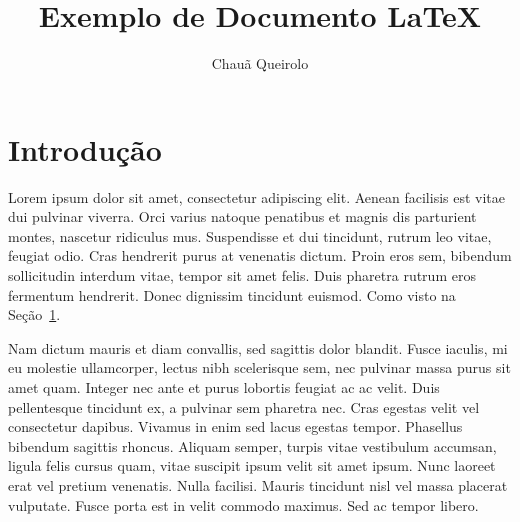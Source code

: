 \documentclass[11pt,twocolumn]{article}
\title{Exemplo de Documento \LaTeX}
\author{Chauã Queirolo}
\begin{document}
\maketitle

\tableofcontents



\section{Introdução}
\label{sec_introducao}

Lorem ipsum dolor sit amet, consectetur adipiscing elit. Aenean facilisis est vitae dui pulvinar viverra. Orci varius natoque penatibus et magnis dis parturient montes, nascetur ridiculus mus. Suspendisse et dui tincidunt, rutrum leo vitae, feugiat odio. Cras hendrerit purus at venenatis dictum. Proin eros sem, bibendum sollicitudin interdum vitae, tempor sit amet felis. Duis pharetra rutrum eros fermentum hendrerit. Donec dignissim tincidunt euismod. Como visto na Seção~\ref{sec_introducao}.

Nam dictum mauris et diam convallis, sed sagittis dolor blandit. Fusce iaculis, mi eu molestie ullamcorper, lectus nibh scelerisque sem, nec pulvinar massa purus sit amet quam. Integer nec ante et purus lobortis feugiat ac ac velit. Duis pellentesque tincidunt ex, a pulvinar sem pharetra nec. Cras egestas velit vel consectetur dapibus. Vivamus in enim sed lacus egestas tempor. Phasellus bibendum sagittis rhoncus. Aliquam semper, turpis vitae vestibulum accumsan, ligula felis cursus quam, vitae suscipit ipsum velit sit amet ipsum. Nunc laoreet erat vel pretium venenatis. Nulla facilisi. Mauris tincidunt nisl vel massa placerat vulputate. Fusce porta est in velit commodo maximus. Sed ac tempor libero.
\end{document}
